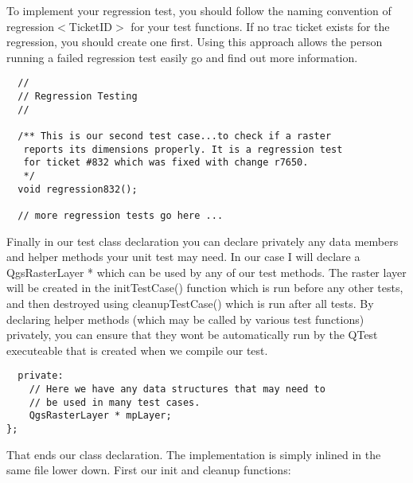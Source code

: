 To implement your regression test, you should follow the naming convention of
regression$<$TicketID$>$ for your test functions. If no trac ticket exists for the
regression, you should create one first.  Using this approach allows the person
running a failed regression test easily go and find out more information.

\begin{verbatim}
  //
  // Regression Testing
  //
  
  /** This is our second test case...to check if a raster
   reports its dimensions properly. It is a regression test 
   for ticket #832 which was fixed with change r7650. 
   */
  void regression832(); 
  
  // more regression tests go here ...
\end{verbatim}

Finally in our test class declaration you can declare privately any data
members and helper methods your unit test may need. In our case I will declare
a QgsRasterLayer * which can be used by any of our test methods. The raster
layer will be created in the initTestCase() function which is run before any
other tests, and then destroyed using cleanupTestCase() which is run after all
tests. By declaring helper methods (which may be called by various test
functions) privately, you can ensure that they wont be automatically run by the
QTest executeable that is created when we compile our test.

\begin{verbatim}
  private:
    // Here we have any data structures that may need to 
    // be used in many test cases.
    QgsRasterLayer * mpLayer;
};

\end{verbatim}

That ends our class declaration. The implementation is simply inlined in the
same file lower down. First our init and cleanup functions:

